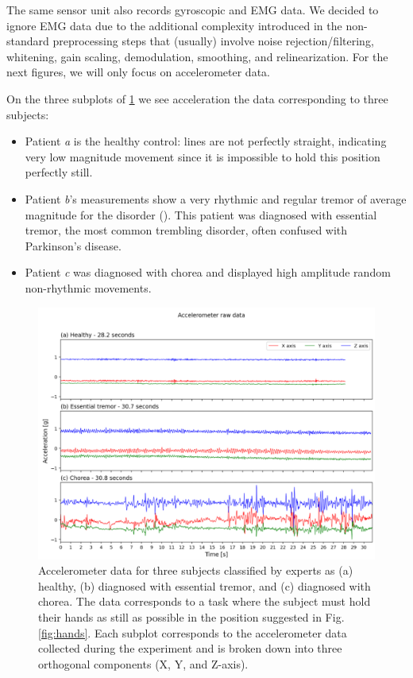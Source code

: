 The same sensor unit also records gyroscopic and EMG data. We decided to ignore EMG data due to the additional complexity introduced in the non-standard preprocessing steps that (usually) involve noise rejection/filtering, whitening, gain scaling, demodulation, smoothing, and relinearization. For the next figures, we will only focus on accelerometer data.


On the three subplots of \cref{fig:acc} we see acceleration the data corresponding to three subjects: 
\begin{itemize}
  \item Patient \textit{a} is the healthy control: lines are not perfectly straight, indicating very low magnitude movement since it is impossible to hold this position perfectly still.
  \item Patient \textit{b}'s measurements show a very rhythmic and regular tremor of average magnitude for the disorder (). This patient was diagnosed with essential tremor, the most common trembling disorder, often confused with Parkinson's disease.
  \item Patient \textit{c} was diagnosed with chorea and displayed high amplitude random non-rhythmic movements. 
\end{itemize}
 

\begin{figure}[ht]
\centering
\includegraphics[width=\linewidth]{figures/nemo/acc2.png}
\caption{Accelerometer data for three subjects classified by experts as (a) healthy, (b) diagnosed with essential tremor, and (c) diagnosed with chorea. The data corresponds to a task where the subject must hold their hands as still as possible in the position suggested in Fig. \ref{fig:hands}.
Each subplot corresponds to the accelerometer data collected during the experiment and is broken down into three orthogonal components (X, Y, and Z-axis). }
\label{fig:acc}
\end{figure}


